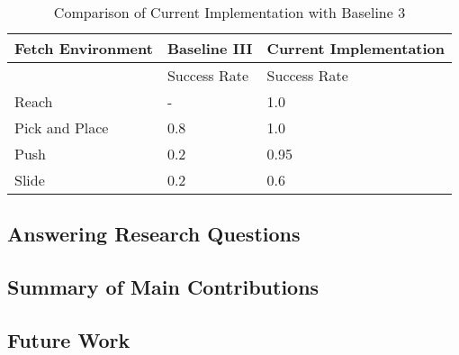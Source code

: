 \begin{table}[h!]
\begin{tabular}{|l|l|l|}
\hline
Fetch Environment & Baseline III   & Current Implementation \\ \hline
                  & Success Rate & Success Rate           \\ \hline
Reach             & -            & 1.0                    \\ \hline
Pick and Place    & 0.8          & 1.0                    \\ \hline
Push              & 0.2          & 0.95                   \\ \hline
Slide             & 0.2          & 0.6                    \\ \hline
\end{tabular}
\caption{Comparison of Current Implementation with Baseline 3}
\label{tab:my-table}
\end{table}

\subsection{Answering Research Questions}

\subsection{Summary of Main Contributions}

\subsection{Future Work}

